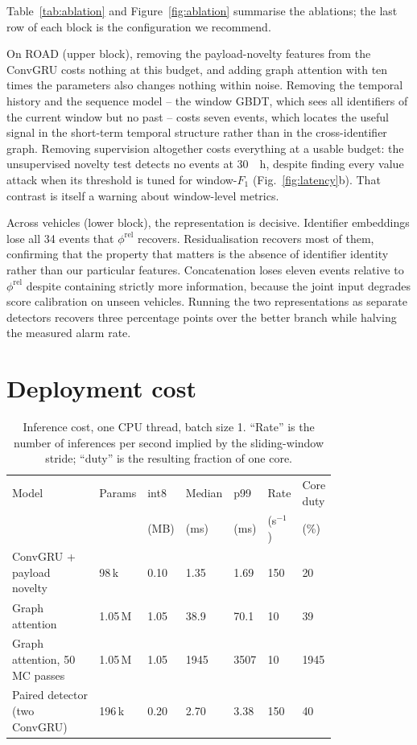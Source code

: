 \documentclass[preprint,11pt,authoryear]{elsarticle}
\newcommand{\phirel}{\phi^{\mathrm{rel}}}
\begin{document}
Table~\ref{tab:ablation} and Figure~\ref{fig:ablation} summarise the ablations; the last row of each
block is the configuration we recommend.

On ROAD (upper block), removing the payload-novelty features from the ConvGRU costs nothing at this
budget, and adding graph attention with ten times the parameters also changes nothing within noise.
Removing the temporal history and the sequence model -- the window GBDT, which sees all identifiers
of the current window but no past -- costs seven events, which locates the useful signal in the
short-term temporal structure rather than in the cross-identifier graph. Removing supervision
altogether costs everything at a usable budget: the unsupervised novelty test detects no events at
\SI{30}{\per\hour}, despite finding every value attack when its threshold is tuned for window-$F_1$
(Fig.~\ref{fig:latency}b). That contrast is itself a warning about window-level metrics.

Across vehicles (lower block), the representation is decisive. Identifier embeddings lose all 34
events that $\phirel$ recovers. Residualisation recovers most of them, confirming that the property
that matters is the absence of identifier identity rather than our particular features.
Concatenation loses eleven events relative to $\phirel$ despite containing strictly more information,
because the joint input degrades score calibration on unseen vehicles. Running the two
representations as separate detectors recovers three percentage points over the better branch while
halving the measured alarm rate.

\section{Deployment cost}
\label{sec:cost}

\begin{table}[htbp]
\centering
\caption{Inference cost, one CPU thread, batch size 1. ``Rate'' is the number of inferences per
second implied by the sliding-window stride; ``duty'' is the resulting fraction of one core.}
\label{tab:cost}
\footnotesize
\setlength{\tabcolsep}{3pt}
\begin{tabular}{@{}L{0.30\linewidth}C{0.09\linewidth}C{0.07\linewidth}C{0.09\linewidth}C{0.07\linewidth}C{0.09\linewidth}C{0.09\linewidth}@{}}
\toprule
Model & Params & int8 & Median & p99 & Rate & Core duty\\
      &        & (MB) & (ms)   & (ms) & (s$^{-1}$) & (\%)\\
\midrule
ConvGRU + payload novelty     & 98\,k   & 0.10 & 1.35 & 1.69 & 150 & 20\\
Graph attention               & 1.05\,M & 1.05 & 38.9 & 70.1 & 10  & 39\\
Graph attention, 50 MC passes & 1.05\,M & 1.05 & 1945 & 3507 & 10  & 1945\\
\midrule
Paired detector (two ConvGRU) & 196\,k  & 0.20 & 2.70 & 3.38 & 150 & 40\\
\bottomrule
\end{tabular}
\end{table}
\end{document}
